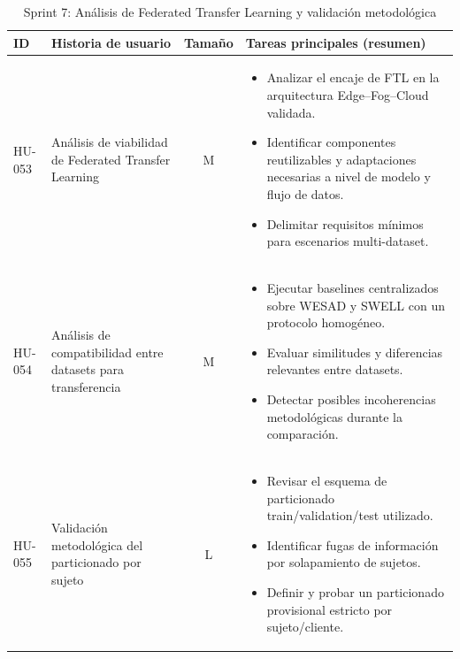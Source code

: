 \documentclass{report}
\begin{document}
\begin{table}[H]
\centering
\footnotesize
\caption{Sprint 7: Análisis de Federated Transfer Learning y validación metodológica}
\label{tab:sprint7}
\renewcommand{\arraystretch}{1.2}
\setlength{\tabcolsep}{4pt}
\begin{tabular}{|l|p{4.8cm}|c|p{5.6cm}|}
\hline
\textbf{ID} & \textbf{Historia de usuario} & \textbf{Tamaño} & \textbf{Tareas principales (resumen)} \\ \hline

HU-053 &
Análisis de viabilidad de Federated Transfer Learning &
M &
\begin{itemize}\setlength\itemsep{0.15em}
  \item Analizar el encaje de FTL en la arquitectura Edge--Fog--Cloud validada.
  \item Identificar componentes reutilizables y adaptaciones necesarias a nivel de modelo y flujo de datos.
  \item Delimitar requisitos mínimos para escenarios multi-dataset.
\end{itemize}
\\ \hline

HU-054 &
Análisis de compatibilidad entre datasets para transferencia &
M &
\begin{itemize}\setlength\itemsep{0.15em}
  \item Ejecutar baselines centralizados sobre WESAD y SWELL con un protocolo homogéneo.
  \item Evaluar similitudes y diferencias relevantes entre datasets.
  \item Detectar posibles incoherencias metodológicas durante la comparación.
\end{itemize}
\\ \hline

HU-055 &
Validación metodológica del particionado por sujeto &
L &
\begin{itemize}\setlength\itemsep{0.15em}
  \item Revisar el esquema de particionado train/validation/test utilizado.
  \item Identificar fugas de información por solapamiento de sujetos.
  \item Definir y probar un particionado provisional estricto por sujeto/cliente.
\end{itemize}
\\ \hline

\end{tabular}
\end{table}
\end{document}
